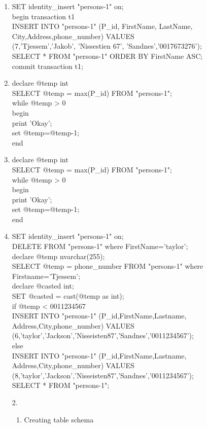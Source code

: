 \documentclass{article}
\begin{document}
\begin{enumerate}
	    \item %

		    SET identity\_insert "persons-1" on;\\
	    begin transaction t1\\
	    INSERT INTO "persons-1" (P\_id, FirstName, LastName, City,Address,phone\_number) VALUES \\
	    (7,'Tjessem','Jakob', 'Nissestien 67', 'Sandnes','0017673276');\\
    SELECT * FROM "persons-1" ORDER BY FirstName ASC;\\
		commit transaction t1;\\
\item %

	declare @temp int\\
	SELECT @temp = max(P\_id) FROM "persons-1";\\
while @temp > 0\\
begin\\
print 'Okay';\\
		set @temp=@temp-1;\\
	end\\

\item %
	declare @temp int\\
	SELECT @temp = max(P\_id) FROM "persons-1";\\
while @temp > 0\\
begin\\
print 'Okay';\\
		set @temp=@temp-1;\\
	end\\
\item %

	SET identity\_insert "persons-1" on;\\
DELETE FROM "persons-1" where FirstName='taylor';\\
		declare @temp nvarchar(255);\\
	SELECT @temp = phone\_number FROM "persons-1" where Firstname='Tjessem';\\
declare @casted int;\\
		SET @casted = cast(@temp as int);\\
	if @temp < 0011234567\\
	INSERT INTO "persons-1" (P\_id,FirstName,Lastname, Address,City,phone\_number) VALUES (6,'taylor','Jackson','Nisseisten87','Sandnes','0011234567');\\
else\\
INSERT INTO "persons-1" (P\_id,FirstName,Lastname, Address,City,phone\_number) VALUES (8,'taylor','Jackson','Nisseisten87','Sandnes','0011234567');\\
		SELECT * FROM "persons-1";\\
\item[2.]
	\begin{enumerate}
		\item Creating table schema


\end{enumerate}
\end{enumerate}
\end{document}
